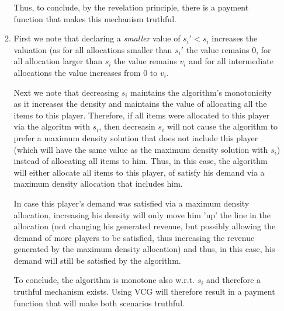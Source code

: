 \documentclass[a4page,notitlepage]{article}
\begin{document}
\begin{enumerate}
\begin{enumerate}
      Thus, to conclude, by the revelation principle, there is a payment function that makes this mechanism truthful.
      \item
        First we note that declaring a \emph{smaller} value of $s_i'<s_i$ increases the valuation (as for all allocations smaller than $s_i'$ the value remains 0, for all allocation larger than $s_i$ the value remains $v_i$ and for all intermediate allocations the value increases from 0 to $v_i$.

        Next we note that decreasing $s_i$ maintains the algorithm's monotonicity as it increases the density and maintains the value of allocating all the items to this player.
        Therefore, if all items were allocated to this player via the algoritm with $s_i$, then decreasin $s_i$ will not cause the algorithm to prefer a maximum density solution that does not include this player (which will have the same value as the maximum density solution with $s_i$) instead of allocating all items to him.
        Thus, in this case, the algorithm will either allocate all items to this player, of satisfy his demand via a maximum density allocation that includes him.

        In case this player's demand was satisfied via a maximum density allocation, increasing his density will only move him 'up' the line in the allocation (not changing his generated revenue, but possibly allowing the demand of more players to be satisfied, thus increasing the revenue generated by the maximum density allocation) and thus, in this case, his demand will still be satisfied by the algorithm.
        
        To conclude, the algorithm is monotone also w.r.t. $s_i$ and therefore a truthful mechanism exists.
        Using VCG will therefore result in a payment function that will make both scenarios truthful.
  \end{enumerate}
\end{enumerate}
\end{document}
